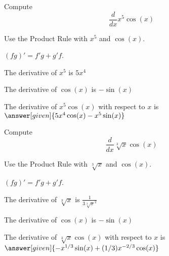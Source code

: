 \documentclass{ximera}
\begin{document}
\begin{center}
\begin{foldable}
\end{foldable}
\end{center}


\begin{problem} %
  Compute
  \[
  \frac{d}{dx} x^5\cos(x)
  \]
  
    \begin{hint}
      Use the Product Rule with $x^5$ and $\cos(x)$.
    \end{hint}
    \begin{hint}
      $(fg)' = f'g+g'f$.
    \end{hint}
    \begin{hint}
      The derivative of $x^5$ is $5x^4$
    \end{hint}
    \begin{hint}
      The derivative of $\cos(x)$ is $-\sin(x)$
    \end{hint}
    
		The derivative of $x^5\cos(x)$ with respect to $x$ is
		 $\answer[given]{5x^4\cos(x) - x^5\sin(x)}$
		
\end{problem}



\begin{problem} %
  Compute
  \[
  \frac{d}{dx} \sqrt[3]x \cos(x)
  \]
  
    \begin{hint}
      Use the Product Rule with $\sqrt[3] x$ and $\cos(x)$.
    \end{hint}
    \begin{hint}
      $(fg)' = f'g+g'f$.
    \end{hint}
    \begin{hint}
      The derivative of $\sqrt[3]x$ is $\frac{1}{3\sqrt[3]x^2}$
    \end{hint}
    \begin{hint}
      The derivative of $\cos(x)$ is $-\sin(x)$
    \end{hint}
    
		The derivative of $\sqrt[3]x\cos(x)$ with respect to $x$ is
		 $\answer[given]{-x^{1/3}\sin(x) + (1/3)x^{-2/3}\cos(x)}$
		
\end{problem}
\end{document}
